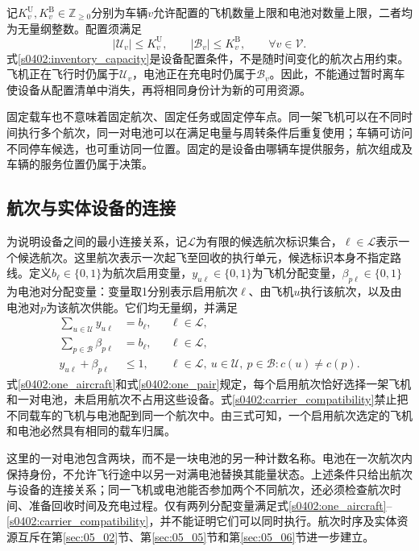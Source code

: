 记$K_v^{\mathrm U},K_v^{\mathrm B}\in\mathbb Z_{\ge0}$分别为车辆$v$允许配置的飞机数量上限和电池对数量上限，二者均为无量纲整数。配置须满足
\begin{equation}
 |\mathcal U_v|\le K_v^{\mathrm U},
 \qquad |\mathcal B_v|\le K_v^{\mathrm B},
 \qquad \forall v\in\mathcal V.
 \label{s0402:inventory_capacity}
\end{equation}
式\eqref{s0402:inventory_capacity}是设备配置条件，不是随时间变化的航次占用约束。飞机正在飞行时仍属于$\mathcal U_v$，电池正在充电时仍属于$\mathcal B_v$。因此，不能通过暂时离车使设备从配置清单中消失，再将相同身份计为新的可用资源。

固定载车也不意味着固定航次、固定任务或固定停车点。同一架飞机可以在不同时间执行多个航次，同一对电池可以在满足电量与周转条件后重复使用；车辆可访问不同停车候选，也可重访同一位置。固定的是设备由哪辆车提供服务，航次组成及车辆的服务位置仍属于决策。

\subsection{航次与实体设备的连接}

为说明设备之间的最小连接关系，记$\mathcal L$为有限的候选航次标识集合，$\ell\in\mathcal L$表示一个候选航次。这里航次表示一次起飞至回收的执行单元，候选标识本身不指定路线。定义$b_\ell\in\{0,1\}$为航次启用变量，$y_{u\ell}\in\{0,1\}$为飞机分配变量，$\beta_{p\ell}\in\{0,1\}$为电池对分配变量：变量取1分别表示启用航次$\ell$、由飞机$u$执行该航次，以及由电池对$p$为该航次供能。它们均无量纲，并满足
\begin{align}
 \sum_{u\in\mathcal U}y_{u\ell}&=b_\ell,
 &&\ell\in\mathcal L,
 \label{s0402:one_aircraft}\\
 \sum_{p\in\mathcal B}\beta_{p\ell}&=b_\ell,
 &&\ell\in\mathcal L,
 \label{s0402:one_pair}\\
 y_{u\ell}+\beta_{p\ell}&\le1,
 &&\ell\in\mathcal L,\ u\in\mathcal U,\ p\in\mathcal B:
 c(u)\ne c(p).
 \label{s0402:carrier_compatibility}
\end{align}
式\eqref{s0402:one_aircraft}和式\eqref{s0402:one_pair}规定，每个启用航次恰好选择一架飞机和一对电池，未启用航次不占用这些设备。式\eqref{s0402:carrier_compatibility}禁止把不同载车的飞机与电池配到同一个航次中。由三式可知，一个启用航次选定的飞机和电池必然具有相同的载车归属。

这里的一对电池包含两块，而不是一块电池的另一种计数名称。电池在一次航次内保持身份，不允许飞行途中以另一对满电池替换其能量状态。上述条件只给出航次与设备的连接关系；同一飞机或电池能否参加两个不同航次，还必须检查航次时间、准备回收时间及充电过程。仅有两列分配变量满足式\eqref{s0402:one_aircraft}--\eqref{s0402:carrier_compatibility}，并不能证明它们可以同时执行。航次时序及实体资源互斥在第\ref{sec:05_02}节、第\ref{sec:05_05}节和第\ref{sec:05_06}节进一步建立。

